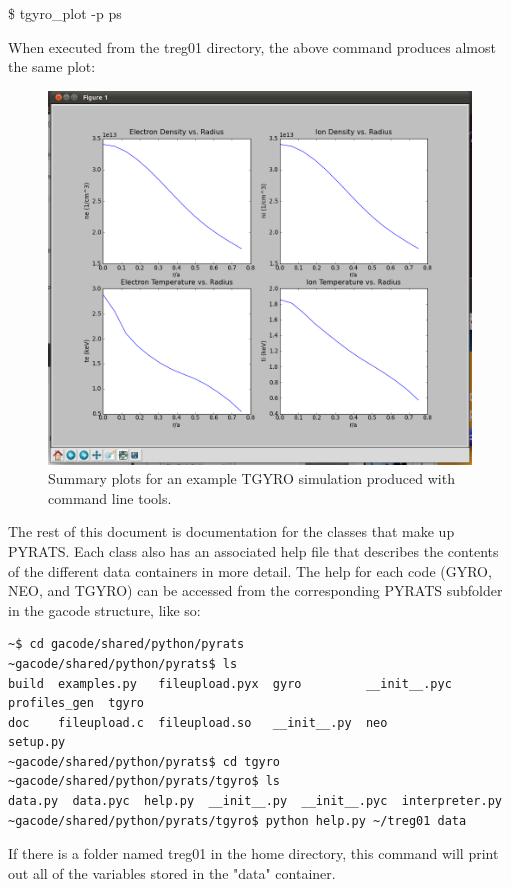 \documentclass{article}
\begin{document}
\fontfamily{\ttdefault}\selectfont

\$ tgyro\_plot -p ps

\fontfamily{\rmdefault}\selectfont

\noindent When executed from the treg01 directory, the above command produces almost the same plot:

\begin{figure}[H]
  \centering
    \includegraphics[scale=.4]{pssht2.png}
  \caption{Summary plots for an example TGYRO simulation produced with command line tools.}
\end{figure}

\noindent The rest of this document is documentation for the classes that make up PYRATS.  Each class also has an associated help file that describes the contents of the different data containers in more detail.  The help for each code (GYRO, NEO, and TGYRO) can be accessed from the corresponding PYRATS subfolder in the gacode structure, like so:
\begin{verbatim}
~$ cd gacode/shared/python/pyrats
~gacode/shared/python/pyrats$ ls
build  examples.py   fileupload.pyx  gyro         __init__.pyc  profiles_gen  tgyro
doc    fileupload.c  fileupload.so   __init__.py  neo           setup.py
~gacode/shared/python/pyrats$ cd tgyro
~gacode/shared/python/pyrats/tgyro$ ls
data.py  data.pyc  help.py  __init__.py  __init__.pyc  interpreter.py
~gacode/shared/python/pyrats/tgyro$ python help.py ~/treg01 data
\end{verbatim}
\noindent If there is a folder named treg01 in the home directory, this command will print out all of the variables stored in the "data" container.
\end{document}
